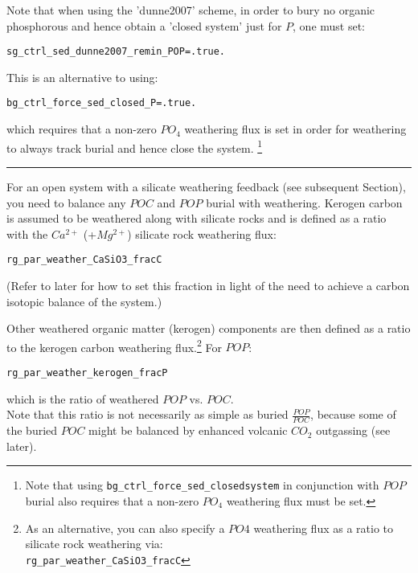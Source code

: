 \begin{enumerate}
\vspace{1mm}
Note that when using the 'dunne2007' scheme, in order to bury no organic phosphorous and hence obtain a 'closed system' just for \(P\), one must set:
\vspace{-1mm}\small\begin{verbatim}
sg_ctrl_sed_dunne2007_remin_POP=.true.
\end{verbatim}\normalsize\vspace{-1mm}
This is an alternative to using:
\vspace{-1mm}\small\begin{verbatim}
bg_ctrl_force_sed_closed_P=.true.
\end{verbatim}\normalsize\vspace{-1mm}
which requires that a non-zero \(PO_{4}\) weathering flux is set in order for weathering to always track burial and hence close the system. \footnote{Note that using \texttt{bg\_ctrl\_force\_sed\_closedsystem} in conjunction with \(POP\) burial also requires that a non-zero \(PO_{4}\) weathering flux must be set.}

\vspace{1mm}
\noindent\rule{4cm}{0.5pt}
\vspace{2mm}

\newpage 

For an open system with a silicate weathering feedback (see subsequent Section), you need to balance any \(POC\) and \(POP\) burial with weathering. Kerogen carbon is assumed to be weathered along with silicate rocks and is defined as a ratio with the \(Ca^{2+}\) (+\(Mg^{2+}\)) silicate rock weathering flux:
\vspace{-1mm}\small\begin{verbatim}
rg_par_weather_CaSiO3_fracC
\end{verbatim}\normalsize\vspace{-1mm} 
(Refer to later for how to set this fraction in light of the need to achieve a carbon isotopic balance of the system.)

Other weathered organic matter (kerogen) components are then defined as a ratio to the kerogen carbon weathering flux.\footnote{As an alternative, you can also specify a \(PO4\) weathering flux as a ratio to silicate rock weathering via:\\\texttt{rg\_par\_weather\_CaSiO3\_fracC} } For \(POP\):
\vspace{-1mm}\begin{verbatim}
rg_par_weather_kerogen_fracP
\end{verbatim}\vspace{-1mm} 
which is the ratio of weathered \(POP\) vs. \(POC\).
\vspace{1mm}
\\Note that this ratio is not necessarily as simple as buried \(\frac{POP}{POC}\), because some of the buried \(POC\) might be balanced by enhanced volcanic \(CO_{2}\) outgassing (see later).


\end{enumerate}
